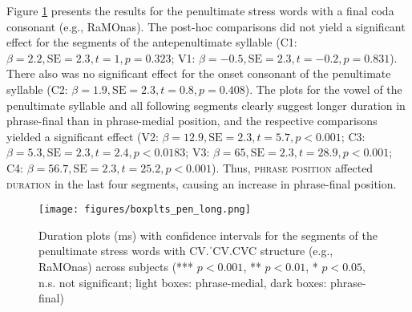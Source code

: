 \documentclass[output=paper]{langscibook}
\begin{document}
Figure \ref{fig:pen_long} presents the results for the penultimate stress words with a final coda consonant (e.g., RaMOnas). The post-hoc comparisons did not yield a significant effect for the segments of the antepenultimate syllable (C1: $\beta=2.2,\allowbreak \text{SE}=2.3,\allowbreak t=1,\allowbreak p=0.323$; V1: $\beta=-0.5,\allowbreak \text{SE}=2.3,\allowbreak t=-0.2,\allowbreak p=0.831$). There also was no significant effect for the onset consonant of the penultimate syllable (C2: $\beta=1.9,\allowbreak \text{SE}=2.3,\allowbreak t=0.8,\allowbreak p=0.408$). The plots for the vowel of the penultimate syllable and all following segments clearly suggest longer duration in phrase-final than in phrase-medial position, and the respective comparisons yielded a significant effect (V2: $\beta=12.9,\allowbreak \text{SE}=2.3,\allowbreak t=5.7,\allowbreak p<0.001$; C3: $\beta=5.3,\allowbreak \text{SE}=2.3,\allowbreak t=2.4,\allowbreak p<0.0183$; V3: $\beta=65,\allowbreak \text{SE}=2.3,\allowbreak t=28.9,\allowbreak p<0.001$; C4: $\beta=56.7,\allowbreak \text{SE}=2.3,\allowbreak t=25.2,\allowbreak p<0.001$). Thus, \textsc{phrase position} affected \textsc{duration} in the last four segments, causing an increase in phrase-final position.


\begin{figure}%
    \centering
    \texttt{[image: figures/boxplts\_pen\_long.png]}
    \caption{Duration plots (ms) with confidence intervals for the segments of the penultimate stress words with CV.ˈCV.CVC structure (e.g., RaMOnas) across subjects (*** $p<0.001$, ** $p<0.01$, * $p<0.05$, n.s. not significant; light boxes: phrase-medial, dark boxes: phrase-final)}
    \label{fig:pen_long}
\end{figure}
\end{document}

